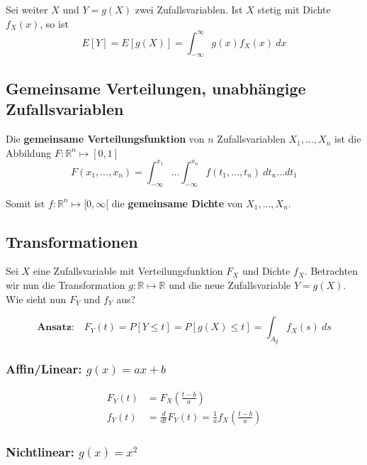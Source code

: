 \documentclass[11pt]{article}
\begin{document}
Sei weiter $X$ und $Y = g(X)$ zwei Zufallsvariablen. Ist $X$ stetig mit Dichte $f_X(x)$, so ist
\begin{equation*}
	E[Y] = E[g(X)] = \int_{-\infty}^\infty g(x)f_X(x)\ dx
\end{equation*} 

\subsection{Gemeinsame Verteilungen, unabh{\"a}ngige Zufallsvariablen}

Die \textbf{gemeinsame Verteilungsfunktion} von $n$ Zufallsvariablen $X_1,...,X_n$ ist die Abbildung $F: \mathbb{R}^n \mapsto [0,1]$
\begin{equation*}
	F(x_1,...,x_n) = \int_{-\infty}^{x_1} ... \int_{-\infty}^{x_n} f(t_1,...,t_n)\ dt_n...dt_1
\end{equation*}

Somit ist $f: \mathbb{R}^n \mapsto [0, \infty[$ die \textbf{gemeinsame Dichte} von $X_1,...,X_n$.

\subsection{Transformationen}

Sei $X$ eine Zufallsvariable mit Verteilungsfunktion $F_X$ und Dichte $f_X$. Betrachten wir nun die Transformation $g: \mathbb{R} \mapsto \mathbb{R}$ und die neue Zufallsvariable $Y = g(X)$. Wie sieht nun $F_Y$ und $f_Y$ aus?

\begin{equation*}
	\textbf{Ansatz:}\quad F_Y(t) = P[Y \leq t] = P[g(X) \leq t] = \int_{A_g} f_X(s)\ ds
\end{equation*}

\subsubsection{Affin/Linear: $g(x) = ax + b$}

\begin{equation*}
\begin{split}
	F_Y(t) & = F_X(\frac{t-b}{a}) \\
	f_Y(t) & = \frac{d}{dt} F_Y(t) = \frac{1}{a}f_X(\frac{t-b}{a})
\end{split}
\end{equation*}

\subsubsection{Nichtlinear: $g(x) = x^2$}
\end{document}

